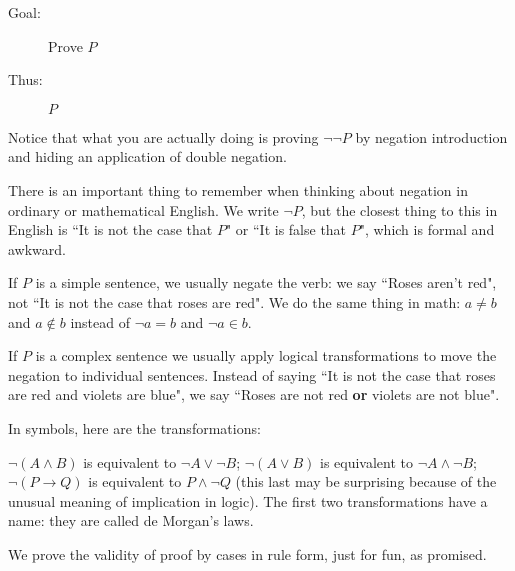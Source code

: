 \documentclass[12pt]{article}
\begin{document}
\begin{description}

\item[Goal:]  Prove $P$

\item[Thus:]  $P$
\end{description}

Notice that what you are actually doing is proving $\neg\neg P$ by negation introduction and hiding an application of double negation.

There is an important thing to remember when thinking about negation in ordinary or mathematical English.  We write $\neg  P$, but the closest thing to this in English is ``It is not the case that $P$" or ``It is false that $P$", which is formal and awkward.

If $P$ is a simple sentence, we usually negate the verb:  we say ``Roses aren't red", not ``It is not the case that roses are red".  We do the same thing in math:  $a \neq b$ and $a \not\in b$ instead of $\neg a=b$ and $\neg a \in b$.

If $P$ is a complex sentence we usually apply logical transformations to move the negation to individual sentences.
Instead of saying ``It is not the case that roses are red and violets are blue", we say ``Roses are not red {\bf or} violets are not blue".

In symbols, here are the transformations:

$\neg(A \wedge B)$ is equivalent to $\neg A \vee \neg B$;  $\neg(A \vee B)$ is equivalent to $\neg A \wedge \neg B$;  $\neg(P \rightarrow Q)$ is equivalent to $P \wedge \neg Q$ (this last may be surprising because of the unusual meaning of implication in logic).  The first two transformations have a name:  they are called de Morgan's laws.

We prove the validity of proof by cases in rule form, just for fun, as promised.
\end{document}
